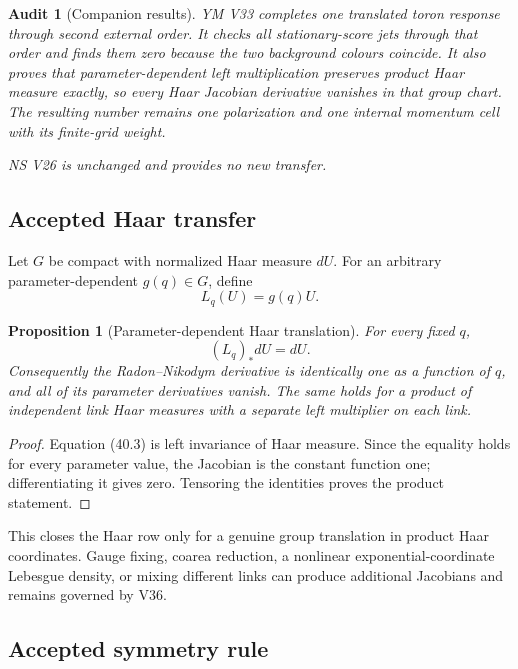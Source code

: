 \documentclass[11pt]{article}
\newtheorem{proposition}[theorem]{Proposition}
\newtheorem{audit}[theorem]{Audit}
\begin{document}
\begin{audit}[Companion results]
\label{audit:v11v40-companions}
YM V33 completes one translated toron response through second external
order.  It checks all stationary-score jets through that order and
finds them zero because the two background colours coincide.  It also
proves that parameter-dependent left multiplication preserves product
Haar measure exactly, so every Haar Jacobian derivative vanishes in
that group chart.  The resulting number remains one polarization and
one internal momentum cell with its finite-grid weight.

NS V26 is unchanged and provides no new transfer.
\end{audit}

\subsection{Accepted Haar transfer}

Let \(G\) be compact with normalized Haar measure \(dU\).  For an
arbitrary parameter-dependent \(g(q)\in G\), define
\[
 L_q(U)=g(q)U.
 \tag{40.2}
\]

\begin{proposition}[Parameter-dependent Haar translation]
\label{prop:v11v40-haar}
For every fixed \(q\),
\[
 (L_q)_*dU=dU.
 \tag{40.3}
\]
Consequently the Radon--Nikodym derivative is identically one as a
function of \(q\), and all of its parameter derivatives vanish.  The
same holds for a product of independent link Haar measures with a
separate left multiplier on each link.
\end{proposition}

\begin{proof}
Equation (40.3) is left invariance of Haar measure.  Since the equality
holds for every parameter value, the Jacobian is the constant function
one; differentiating it gives zero.  Tensoring the identities proves the
product statement.
\end{proof}

This closes the Haar row only for a genuine group translation in product
Haar coordinates.  Gauge fixing, coarea reduction, a nonlinear
exponential-coordinate Lebesgue density, or mixing different links can
produce additional Jacobians and remains governed by V36.

\subsection{Accepted symmetry rule}
\end{document}
